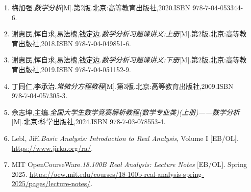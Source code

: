 \documentclass[a4paper,12pt,fleqn,openany,twoside,fontset=windows]{ctexbook}
\begin{document}
\tableofcontents

\clearpage
\let\oldcleardoublepage\cleardoublepage
\let\cleardoublepage\clearpage
\mainmatter
\let\cleardoublepage\oldcleardoublepage
\pagestyle{main}


\def\BookMaster{}












\backmatter
{}
\begin{booknotebody}

\begin{enumerate}[leftmargin=2\ccwd,itemsep=0.55em,topsep=0.4em]
    \item 梅加强.\textit{数学分析}[M].第2版.北京:高等教育出版社,2020.ISBN 978-7-04-053344-6.
    \item 谢惠民,恽自求,易法槐,钱定边.\textit{数学分析习题课讲义:上册}[M].第2版.北京:高等教育出版社,2018.ISBN 978-7-04-049851-6.
    \item 谢惠民,恽自求,易法槐,钱定边.\textit{数学分析习题课讲义:下册}[M].第2版.北京:高等教育出版社,2019.ISBN 978-7-04-051152-9.
    \item 丁同仁,李承治.\textit{常微分方程教程}[M].第3版.北京:高等教育出版社,2009.ISBN 978-7-04-057305-3.
    \item 佘志坤,主编.\textit{全国大学生数学竞赛解析教程(数学专业类)(上册)——数学分析}[M].北京:科学出版社,2024.ISBN 978-7-03-078553-4.
    \item $\text{Lebl, Jiří}$.\enspace\textit{Basic Analysis: Introduction to Real Analysis}, Volume I [EB/OL]. \url{https://www.jirka.org/ra/}.
    \item MIT OpenCourseWare.\enspace\textit{18.100B Real Analysis: Lecture Notes} [EB/OL]. Spring 2025. \url{https://ocw.mit.edu/courses/18-100b-real-analysis-spring-2025/pages/lecture-notes/}.
\end{enumerate}


\end{booknotebody}



\makebackcover
\end{document}
